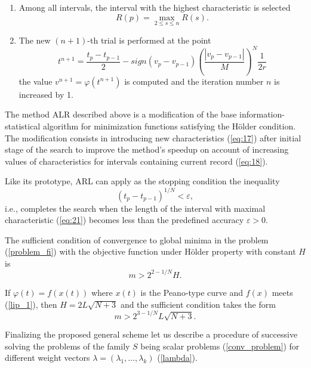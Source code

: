 \documentclass[]{interact}
\theoremstyle{plain}%
\theoremstyle{definition}
\theoremstyle{remark}
\begin{document}
\begin{enumerate}
\item
Among all intervals, the interval   with the highest characteristic is selected
\begin{equation}\label{eq:21}
R(p) = \max_{2 \leq s \leq n} {R(s)}.
\end{equation}

\item
The new $(n+1)$-th trial is performed at the point
\begin{equation}\label{eq:22}
t^{n+1} = \frac{t_p-t_{p-1}}{2} - sign(v_p-v_{p-1}) \left( \frac{|v_p-v_{p-1}|}{M} \right)^N \frac{1}{2r} 
\end{equation}
the value $v^{n+1} = \varphi(t^{n+1})$ is computed and the iteration number $n$ is increased by 1.

\end{enumerate}


The method ALR described above is a modification of the base information-statistical algorithm \cite{Strongin2000,Sergeyev2013} for minimization functions satisfying the H{\"o}lder condition. The modification consists in introducing new characteristics (\ref{eq:17}) after initial stage of the search to improve the method's speedup on account of increasing values of characteristics for intervals containing current record (\ref{eq:18}). 

Like its prototype, ARL can apply as the stopping condition the inequality
\begin{equation}\label{eq:23}
(t_p-t_{p-1})^{1/N} < \varepsilon,
\end{equation}
i.e., completes the search when the length of the interval with maximal characteristic (\ref{eq:21}) becomes less than the predefined accuracy $\varepsilon > 0$.

The sufficient condition of convergence to global minima in the problem (\ref{problem_fi}) with the objective function under H{\"o}lder property with constant $H$ is
\begin{equation}\label{eq:24}
m > 2^{2 - 1 / N}H.
\end{equation}

If $\varphi(t) = f(x(t)) $ where $x(t)$ is the Peano-type curve and $f(x)$ meets (\ref{lip_1}), then $H=2L\sqrt{N+3}$ and the sufficient condition takes the form 
\begin{equation}\label{eq:25}
m > 2^{3 - 1 / N}L\sqrt{N+3}.
\end{equation}

Finalizing the proposed general scheme  let us describe a procedure  of successive solving the problems of the family $S$ being scalar problems (\ref{conv_problem}) for different weight vectors $\lambda = (\lambda_1, \dots,\lambda_k)$ (\ref{lambda}).
\end{document}
